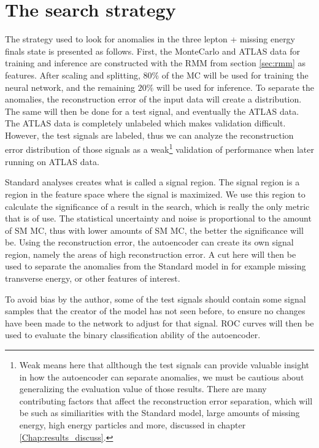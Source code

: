 \section{The search strategy}
The strategy used to look for anomalies in the three lepton + missing energy finals state is presented as follows. First, the MonteCarlo and ATLAS data 
for training and inference are constructed with the RMM from section \ref{sec:rmm} as features. After scaling and splitting, $80\%$ of the MC will be used for 
training the neural network, and the remaining $20\%$ will be used for inference. To separate the anomalies, the reconstruction error of the input data 
will create a distribution. The same will then be done for a test signal, and eventually the ATLAS data. The ATLAS data is completely unlabeled which 
makes validation difficult. However, the test signals are labeled, thus we can analyze the reconstruction error distribution of those signals as a 
weak\footnote{Weak means here that allthough the test signals can provide valuable insight in how the autoencoder can separate anomalies,
 we must be cautious about generalizing the evaluation value of those results. There are many contributing factors that affect the reconstruction error separation, 
 which will be such as similiarities with the Standard model, large amounts of missing energy, high energy particles and more,  discussed in chapter \ref{Chap:results_discuss}. } 
 validation of performance when later running on ATLAS data. 
 
Standard analyses creates what is called a signal region. The signal region is a region in the feature space where the signal is maximized. We use this region to calculate the 
significance of a result in the search, which is really the only metric that is of use. The statistical uncertainty and noise is proportional to the amount of SM MC, thus
with lower amounts of SM MC, the better the significance will be. Using the reconstruction error, the autoencoder can create its own signal region, 
namely the areas of high reconstruction error. A cut here will then be used to separate the anomalies from the Standard model in for example missing transverse energy, or 
other features of interest. 


To avoid bias by the author, 
some of the test signals should contain some signal samples that the creator of the model has not seen before, to ensure no changes have been made 
 to the network to adjust for that signal. ROC curves will then be used to evaluate the binary classification ability of the autoencoder. 